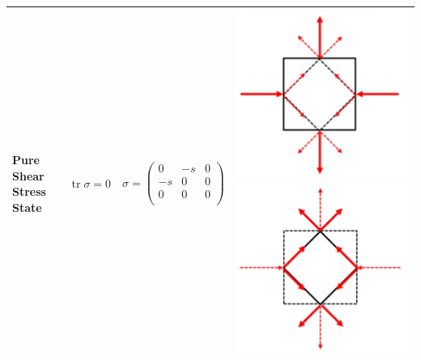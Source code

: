 \begin{tabularx}{\columnwidth}{p{2cm}p{2cm}XX}
		Pure Shear Stress State &$\operatorname{tr}\sigma = 0$&$ \sigma = \begin{pmatrix} 0 &  -s& 0\\ -s & 0 & 0\\ 0 & 0 & 0\\ \end{pmatrix}$&		\vspace*{-1.2cm}\includegraphics[scale=.12]{images/3Dcfpureshear}\includegraphics[scale=.12]{images/3Dcfpureshear2}\\
		\hline 
	\end{tabularx}
	\renewcommand{\arraystretch}{1.2}


